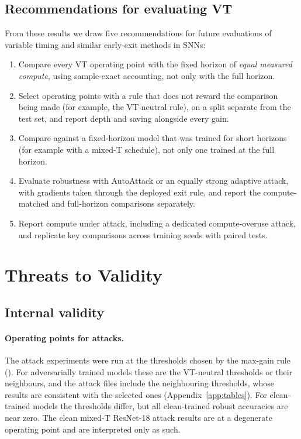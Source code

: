 \subsection{Recommendations for evaluating VT}

From these results we draw five recommendations for future evaluations of variable timing and similar early-exit methods in SNNs:

\begin{enumerate}
    \item Compare every VT operating point with the fixed horizon of \emph{equal measured compute}, using sample-exact accounting, not only with the full horizon.
    \item Select operating points with a rule that does not reward the comparison being made (for example, the VT-neutral rule), on a split separate from the test set, and report depth and saving alongside every gain.
    \item Compare against a fixed-horizon model that was trained for short horizons (for example with a mixed-T schedule), not only one trained at the full horizon.
    \item Evaluate robustness with AutoAttack or an equally strong adaptive attack, with gradients taken through the deployed exit rule, and report the compute-matched and full-horizon comparisons separately.
    \item Report compute under attack, including a dedicated compute-overuse attack, and replicate key comparisons across training seeds with paired tests.
\end{enumerate}

\section{Threats to Validity}
\label{sec:res-threats}

\subsection{Internal validity}

\paragraph{Operating points for attacks.} The attack experiments were run at the thresholds chosen by the max-gain rule (). For adversarially trained models these are the VT-neutral thresholds or their neighbours, and the attack files include the neighbouring thresholds, whose results are consistent with the selected ones (Appendix~\ref{app:tables}). For clean-trained models the thresholds differ, but all clean-trained robust accuracies are near zero. The clean mixed-T ResNet-18 attack results are at a degenerate operating point and are interpreted only as such.

